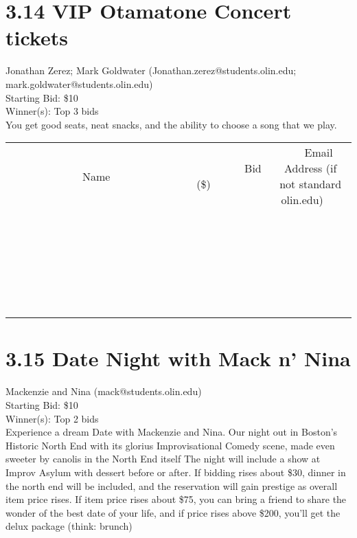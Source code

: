 \documentclass[11pt]{article}
\begin{document}
\section*{3.14 VIP Otamatone Concert tickets}
Jonathan Zerez; Mark Goldwater (Jonathan.zerez@students.olin.edu; mark.goldwater@students.olin.edu) \\
Starting Bid: \$10 \\
Winner(s): 
Top 3 bids \\
You get good seats, neat snacks, and the ability to choose a song that we play. \\[6ex]
\begin{tabular}{c c c}
~~~~~~~~~~~~~Name~~~~~~~~~~~~~ & ~~~~~~~~~Bid (\$)~~~~~~~~~ & ~~~Email Address (if not standard olin.edu)~~~ \\
 & & \\
\hline
 & & \\
\hline
 & & \\
\hline
 & & \\
\hline
 & & \\
\hline
 & & \\
\hline
 & & \\
\hline
 & & \\
\hline
 & & \\
\hline
 & & \\
\hline
 & & \\
\hline
 & & \\
\hline
 & & \\
\hline
 & & \\
\hline
 & & \\
\hline
 & & \\
\hline
 & & \\
\hline
 & & \\
\hline
 & & \\
\hline
 & & \\
\hline
 & & \\
\hline
 & & \\
\hline
 & & \\
\hline
 & & \\
\hline
 & & \\
\hline
 & & \\
\hline
\end{tabular}
\clearpage
\section*{3.15 Date Night with Mack n' Nina}
Mackenzie and Nina (mack@students.olin.edu) \\
Starting Bid: \$10 \\
Winner(s): 
Top 2 bids \\
Experience a dream Date with Mackenzie and Nina. Our night out in Boston's Historic North End with its glorius Improvisational Comedy scene, made even sweeter by canolis in the North End itself  The night will include a show at Improv Asylum with dessert before or after. If bidding rises about \$30, dinner in the north end will be included, and the reservation will gain prestige as overall item price rises. If item price rises about \$75, you can bring a friend to share the wonder of the best date of your life, and if price rises above \$200, you'll get the delux package (think: brunch)
\end{document}
